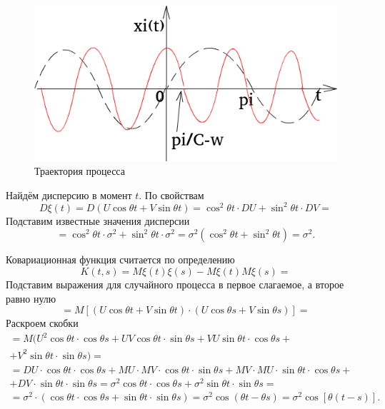 \begin{figure}[h!]
 \centering
 \includegraphics[width=.5\textwidth]{./pictures/2_13.png}
 \caption{Траектория процесса}
 \label{fig:213}
\end{figure}

Найдём дисперсию в момент $t$.
По свойствам
$$D \xi \left( t \right) =
  D \left( U \cos \theta t + V \sin \theta t \right) =
  \cos^2 \theta  t \cdot DU + \sin^2 \theta t \cdot DV =$$
Подставим известные значения дисперсии
$$= \cos^2 \theta t \cdot \sigma^2 + \sin^2 \theta t \cdot \sigma^2 =
  \sigma^2 \left( \cos^2 \theta t + \sin^2 \theta t \right) =
  \sigma^2.$$

Ковариационная функция считается по определению
$$K \left( t, s \right) =
  M \xi \left( t \right) \xi \left( s \right) - M \xi \left( t \right) M \xi \left( s \right) =$$
Подставим выражения для случайного процесса в первое слагаемое, а второе равно нулю
$$= M \left[ \left( U \cos \theta t + V \sin \theta t \right) \cdot
    \left( U \cos \theta s + V \sin \theta s \right) \right] =$$
Раскроем скобки
\begin{equation*}
  \begin{split}
    = M(
      U^2 \cos \theta t \cdot \cos \theta s + UV \cos \theta t \cdot \sin \theta s +
      VU \sin \theta t \cdot \cos \theta
       s + \\
      + V^2 \sin \theta t \cdot \sin \theta s) = \\
    = DU \cdot \cos \theta t \cdot \cos \theta s +
    MU \cdot MV \cdot \cos \theta t \cdot \sin \theta s +
    MV \cdot MU \cdot \sin \theta t \cdot \cos \theta s + \\
    + DV \cdot \sin \theta t \cdot \sin \theta s =
    \sigma^2 \cos \theta t \cdot \cos \theta s + \sigma^2 \sin \theta t \cdot \sin \theta s = \\
    = \sigma^2 \cdot
      \left( \cos \theta t \cdot \cos \theta s + \sin \theta t \cdot \sin \theta s \right) =
    \sigma^2 \cos \left( \theta t - \theta s \right) =
    \sigma^2 \cos \left[ \theta \left( t - s \right) \right].
  \end{split}
\end{equation*}

